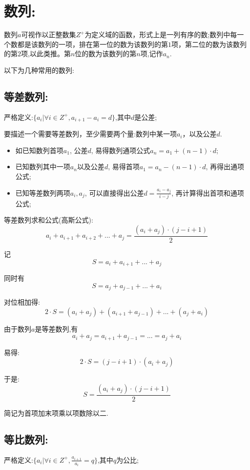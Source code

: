\documentclass[UTF8]{article}
\begin{document}
\section{数列:}

数列$a$可视作以正整数集$Z^{+}$为定义域的函数，形式上是一列有序的数;数列中每一个数都是该数列的一项，排在第一位的数为该数列的第$1$项，第二位的数为该数列的第$2$项,以此类推。第$n$位的数为该数列的第$n$项,记作$a_n$.

以下为几种常用的数列:

\subsection{等差数列:}

严格定义:$\{a_i|\forall i \in Z^{+}, a_{i+1} - a_i = d\}$,其中$d$是公差;

要描述一个需要等差数列，至少需要两个量:数列中某一项$a_i$，以及公差$d$.
\begin{itemize}
	\item 如已知数列首项$a_1$, 公差$d$, 易得数列通项公式$a_n = a_1 + (n-1)\cdot d$;
	\item 已知数列其中一项$a_n$以及公差$d$, 易得首项$a_1 = a_n - (n-1)\cdot d$, 再得出通项公式;
	\item 已知等差数列两项$a_i, a_j$, 可以直接得出公差$d = \frac{a_i - a_j}{i - j}$, 再计算得出首项和通项公式;
\end{itemize}

等差数列求和公式(高斯公式):$$a_i + a_{i+1} + a_{i+2} + ... + a_{j} = \frac{(a_i+a_j)\cdot (j-i+1)}{2}$$

记$$S = a_i + a_{i+1} + ... + a_{j}$$

同时有$$S = a_{j} + a_{j-1} + ... + a_i$$

对位相加得:$$2\cdot S = (a_i + a_j) + (a_{i+1} + a_{j-1}) + ... + (a_j + a_i)$$

由于数列$a$是等差数列,有$$a_i+a_j = a_{i+1} + a_{j-1} = ... = a_j + a_i$$

易得:$$2\cdot S = (j - i + 1)\cdot (a_i + a_j)$$

于是:$$S = \frac{(a_i+a_j)\cdot (j-i+1)}{2}$$

简记为首项加末项乘以项数除以二.

\subsection{等比数列:}

严格定义:$\{a_i|\forall i \in Z^{+}, \frac{a_{i+1}}{a_i} = q\}$,其中$q$为公比;
\end{document}
